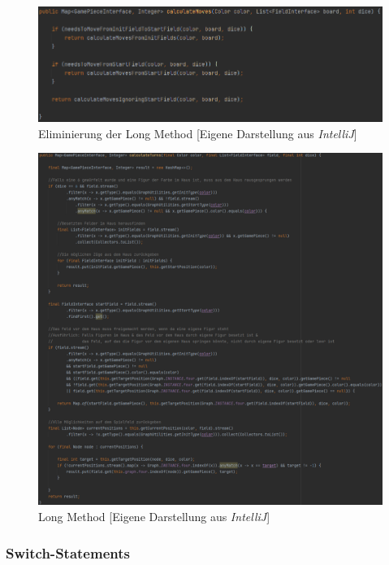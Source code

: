 \begin{figure}[htbp]
\centering
\centerline{\includegraphics[scale=.5]{longmethodsolution}}
\caption{Eliminierung der Long Method [Eigene Darstellung aus \emph{IntelliJ}]}
\label{fig:longmethodsolution}
\end{figure}

\begin{figure}[htbp]
\centering
\centerline{\includegraphics[scale=.65]{longmethod}}
\caption{Long Method [Eigene Darstellung aus \emph{IntelliJ}]}
\label{fig:longmethod}
\end{figure}

\newpage

\subsubsection{Switch-Statements}

